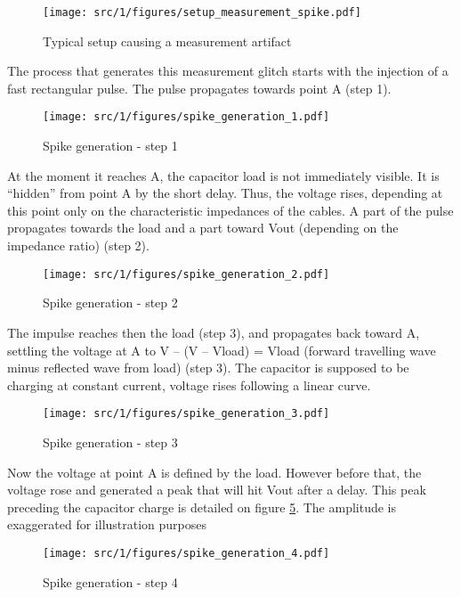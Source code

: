 \begin{figure}[!h]
  \centering
  \texttt{[image: src/1/figures/setup\_measurement\_spike.pdf]}
  \caption{Typical setup causing a measurement artifact}
  \label{fig:setup-measurement-spike}
\end{figure}

The process that generates this measurement glitch starts with the injection of a fast rectangular pulse.
The pulse propagates towards point A (step 1).

\begin{figure}[!h]
  \centering
  \texttt{[image: src/1/figures/spike\_generation\_1.pdf]}
  \caption{Spike generation - step 1}
  \label{fig:spike-step-1}
\end{figure}

At the moment it reaches A, the capacitor load is not immediately visible.
It is “hidden” from point A by the short delay.
Thus, the voltage rises, depending at this point only on the characteristic impedances of the cables.
A part of the pulse propagates towards the load and a part toward Vout (depending on the impedance ratio) (step 2).

\begin{figure}[!h]
  \centering
  \texttt{[image: src/1/figures/spike\_generation\_2.pdf]}
  \caption{Spike generation - step 2}
  \label{fig:spike-step-2}
\end{figure}

The impulse reaches then the load (step 3), and propagates back toward A, settling the voltage at A to
V – (V – Vload) = Vload (forward travelling wave minus reflected wave from load) (step 3).
The capacitor is supposed to be charging at constant current, voltage rises following a linear curve.

\begin{figure}[!h]
  \centering
  \texttt{[image: src/1/figures/spike\_generation\_3.pdf]}
  \caption{Spike generation - step 3}
  \label{fig:spike-step-3}
\end{figure}

Now the voltage at point A is defined by the load.
However before that, the voltage rose and generated a peak that will hit Vout after a delay.
This peak preceding the capacitor charge is detailed on figure \ref{fig:spike-step-4}.
The amplitude is exaggerated for illustration purposes

\begin{figure}[!h]
  \centering
  \texttt{[image: src/1/figures/spike\_generation\_4.pdf]}
  \caption{Spike generation - step 4}
  \label{fig:spike-step-4}
\end{figure}

